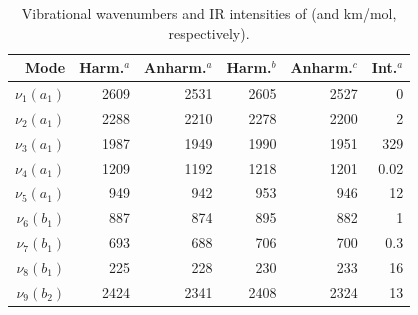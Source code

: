 \begin{table}[ht]
   \caption{Vibrational wavenumbers and IR intensities of \linD (\wn and
km/mol, respectively). }
    \begin{center}
    \begin{tabular}{rrrrrr} \hline
    
        Mode & Harm.$^a$ & Anharm.$^a$ & Harm.$^b$ & Anharm.$^c$ & Int.$^a$ \\ \hline
        $\nu_{1}(a_1)$ & 2609 & 2531 & 2605 & 2527 &  0   \\ %
        $\nu_{2}(a_1)$ & 2288 & 2210 & 2278 & 2200 &  2   \\ %
        $\nu_{3}(a_1)$ & 1987 & 1949 & 1990 & 1951 & 329  \\ %
        $\nu_{4}(a_1)$ & 1209 & 1192 & 1218 & 1201 & 0.02  \\ %
        $\nu_{5}(a_1)$ &  949 &  942 &  953 &  946 & 12   \\ %
        $\nu_{6}(b_1)$ &  887 &  874 &  895 &  882 &  1   \\ %
        $\nu_{7}(b_1)$ &  693 &  688 &  706 &  700 &  0.3 \\ %
        $\nu_{8}(b_1)$ &  225 &  228 &  230 &  233 &  16  \\ %
        $\nu_{9}(b_2)$ & 2424 & 2341 & 2408 & 2324 &  13  \\ %

\end{tabular}
\end{center}
\end{table}
